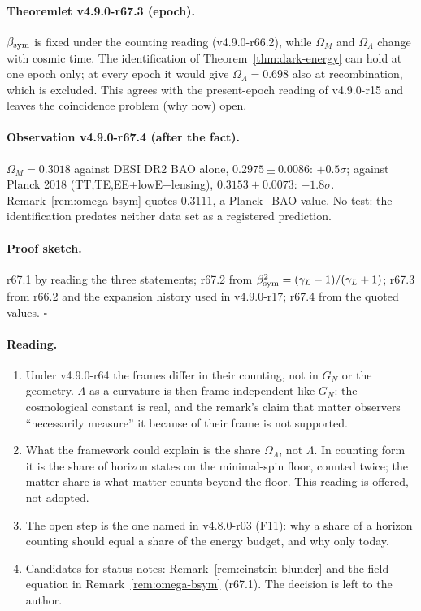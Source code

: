 \paragraph{Theoremlet v4.9.0-r67.3 (epoch).}
\(\beta_{\mathrm{sym}}\) is fixed under the counting reading (v4.9.0-r66.2), while \(\Omega_M\) and \(\Omega_\Lambda\) change with cosmic time.  The identification of
Theorem~\ref{thm:dark-energy} can hold at one epoch only; at every epoch it would give \(\Omega_\Lambda=0.698\) also at recombination, which is excluded.
This agrees with the present-epoch reading of v4.9.0-r15 and leaves the coincidence problem (why now) open.

\paragraph{Observation v4.9.0-r67.4 (after the fact).}
\(\Omega_M=0.3018\) against DESI DR2 BAO alone, \(0.2975\pm0.0086\): \(+0.5\sigma\); against Planck 2018 (TT,TE,EE+lowE+lensing), \(0.3153\pm0.0073\):
\(-1.8\sigma\).  Remark~\ref{rem:omega-bsym} quotes \(0.3111\), a Planck+BAO value.  No test: the identification predates neither data set as a registered
prediction.

\paragraph{Proof sketch.}
r67.1 by reading the three statements; r67.2 from \(\beta_{\mathrm{sym}}^2=(\gamma_L-1)/(\gamma_L+1)\); r67.3 from r66.2 and the expansion history used in v4.9.0-r17; r67.4 from the
quoted values.  \(\square\)

\paragraph{Reading.}
\begin{enumerate}[leftmargin=2em]
\item Under v4.9.0-r64 the frames differ in their counting, not in \(G_N\) or the geometry.  \(\Lambda\) as a curvature is then frame-independent like \(G_N\):
the cosmological constant is real, and the remark's claim that matter observers ``necessarily measure'' it because of their frame is not supported.
\item What the framework could explain is the share \(\Omega_\Lambda\), not \(\Lambda\).  In counting form it is the share of horizon states on the minimal-spin
floor, counted twice; the matter share is what matter counts beyond the floor.  This reading is offered, not adopted.
\item The open step is the one named in v4.8.0-r03 (F11): why a share of a horizon counting should equal a share of the energy budget, and why only today.
\item Candidates for status notes: Remark~\ref{rem:einstein-blunder} and the field equation in Remark~\ref{rem:omega-bsym} (r67.1).  The decision is left to
the author.
\end{enumerate}

